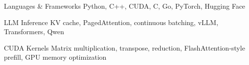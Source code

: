 

\begin{cvskills}

  \cvskill
    {Languages \& Frameworks}
    {Python, C++, CUDA, C, Go, PyTorch, Hugging Face}

  \cvskill
    {LLM Inference}
    {KV cache, PagedAttention, continuous batching, vLLM, Transformers, Qwen}

  \cvskill
    {CUDA Kernels}
    {Matrix multiplication, transpose, reduction, FlashAttention-style prefill, GPU memory optimization}

\end{cvskills}
